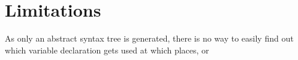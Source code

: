 \section{Limitations}

As only an abstract syntax tree is generated, there is no way to easily find out which variable declaration gets used at which places, or 
